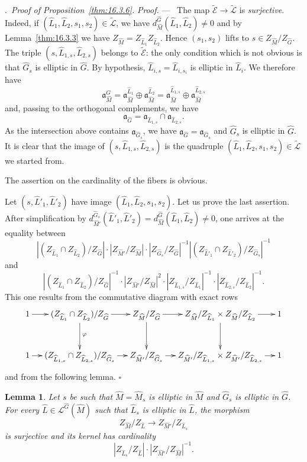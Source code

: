 \documentclass[12pt,a4paper,oneside,english,leqno]{smfart}
\makeatletter
\numberwithin{equation}{subsection}
\newcounter{theo}
\numberwithin{theo}{subsection}
\newenvironment{paragr}[1][]{\medskip\refstepcounter{subsection}%
  \par\noindent\hspace*{\parindent}\thesubsection.\ \emph{#1}%
  \@ifundefined{@empty}{}{}\ignorespaces}{\medskip}
\theoremstyle{plain}
\newtheorem{lemma}[theo]{Lemma}
\theoremstyle{definition}
\theoremstyle{remark}
\newenvironment{preuve}[1][]{\medskip\noindent\textit{Proof.} #1 ---\ }%
  {\hfill\ensuremath{\square}\medskip}
\newcommand{\ec}{\mathcal{E}}
\newcommand{\lc}{\mathcal{L}}
\newcommand{\Gc}{\widehat{G}}
\newcommand{\Mc}{\widehat{M}}
\newcommand{\Lc}{\widehat{L}}
\newcommand{\ago}{\mathfrak{a}}
\makeatother
\begin{document}
\begin{paragr}[Proof of Proposition~\ref{thm:16.3.6}.]
\begin{preuve}
The map $\tilde{\ec}\to\tilde{\lc}$ is \emph{surjective}. Indeed, if $(\Lc_1,\Lc_2,s_1,s_2)\in\tilde{\lc}$, we have $d_{\Mc}^{\Gc}(\Lc_1,\Lc_2)\neq 0$ and by Lemma~\ref{thm:16.3.3} we have $Z_{\Mc}=Z_{\Lc_1}Z_{\Lc_2}$. Hence $(s_1,s_2)$ lifts to $s\in Z_{\Mc}/Z_{\Gc}$. The triple $(s,\Lc_{1,s},\Lc_{2,s})$ belongs to $\tilde{\ec}$: the only condition which is not obvious is that $\Gc_s$ is elliptic in $\Gc$. By hypothesis, $\Lc_{i,s}=\Lc_{i,s_i}$ is elliptic in $\Lc_i$. We therefore have
$$
\ago_{\Mc}^{\Gc}=\ago_{\Mc}^{\Lc_1}\oplus\ago_{\Mc}^{\Lc_2} =\ago_{\Mc}^{\Lc_{1,s}}\oplus\ago_{\Mc}^{\Lc_{2,s}}
$$
and, passing to the orthogonal complements, we have
$$
\ago_{\Gc}=\ago_{\Lc_{1,s}}\cap\ago_{\Lc_{2,s}}.
$$
As the intersection above contains $\ago_{\Gc_s}$, we have $\ago_{\Gc}=\ago_{\Gc_s}$ and $\Gc_s$ is elliptic in $\Gc$. It is clear that the image of $(s,\Lc_{1,s},\Lc_{2,s})$ is the quadruple $(\Lc_1,\Lc_2,s_1,s_2)\in\tilde{\lc}$ we started from.

The assertion on the cardinality of the fibers is obvious.

Let $(s,\Lc'_1,\Lc'_2)$ have image $(\Lc_1,\Lc_2,s_1,s_2)$. Let us prove the last assertion. After simplification by $d_{\Mc'}^{\Gc_s}(\Lc'_1,\Lc'_2)=d_{\Mc}^{\Gc}(\Lc_1,\Lc_2)\neq 0$, one arrives at the equality between
$$
|(Z_{\Lc_1}\cap Z_{\Lc_2})/Z_{\Gc}|\cdot|Z_{\Mc'}/Z_{\Mc}|\cdot |Z_{\Gc_s}/Z_{\Gc}|^{-1}|(Z_{\Lc'_1}\cap Z_{\Lc'_2})/Z_{\Gc_s}|^{-1}
$$
and
$$
|(Z_{\Lc_1}\cap Z_{\Lc_2})/Z_{\Gc}|^{-1}\cdot|Z_{\Mc'}/Z_{\Mc}|^2\cdot |Z_{\Lc_{1,s}}/Z_{\Lc_1}|^{-1}\cdot|Z_{\Lc_{2,s}}/Z_{\Lc_2}|^{-1}.
$$
This one results from the commutative diagram with exact rows
{\small
\[
\xymatrix@C=1pc@R=2.6pc{ 1\ar[r] & (Z_{\Lc_1}\cap Z_{\Lc_2})/Z_{\Gc}\ar[r]\ar[d]^{\varphi} & Z_{\Mc}/Z_{\Gc}\ar[r]\ar[d] &
Z_{\Mc}/Z_{\Lc_1}\times Z_{\Mc}/Z_{\Lc_2}\ar[r]\ar[d] & 1\\
1\ar[r] & (Z_{\Lc_{1,s}}\cap Z_{\Lc_{2,s}})/Z_{\Gc_s}\ar[r] & Z_{\Mc'}/Z_{\Gc_s}\ar[r] & Z_{\Mc'}/Z_{\Lc_{1,s}}\times Z_{\Mc'}/Z_{\Lc_{2,s}}\ar[r] & 1 }
\]
}
and from the following lemma.
\end{preuve}

\begin{lemma}\label{thm:16.5.2}
Let $s$ be such that $\Mc=\Mc_s$ is elliptic in $\Mc$ and $\Gc_s$ is elliptic in $\Gc$. For every $\Lc\in\lc^{\Gc}(\Mc)$ such that $\Lc_s$ is elliptic in $\Lc$, the morphism
$$
Z_{\Mc}/Z_{\Lc}\to Z_{\Mc'}/Z_{\Lc_s}
$$
is surjective and its kernel has cardinality
$$
|Z_{\Lc_s}/Z_{\Lc}|\cdot|Z_{\Mc'}/Z_{\Mc}|^{-1}.
$$
\end{lemma}


\end{paragr}
\end{document}
